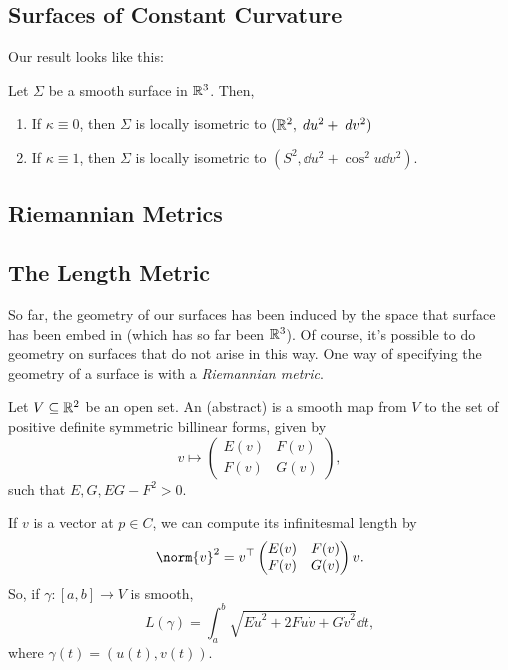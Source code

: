 \documentclass[a4paper, 10pt, twocolumn]{amsart}
\begin{document}
\subsection{Surfaces of Constant Curvature}

Our result looks like this:

\begin{proposition}
    Let $\Sigma$ be a smooth surface in $\mathbb{R}^3$. Then,
    \begin{enumerate}[label=(\roman*)]
        \item If $\kappa \equiv 0$, then $\Sigma$ is locally isometric to $(\mathbb{R}^2, \; d u^2 + \; d v^2)$
        \item If $\kappa \equiv 1$, then $\Sigma$ is locally isometric to $(S^2, \dd u^2 + \cos^2 u  \dd v^2)$.
    \end{enumerate}
\end{proposition}

\subsection{Riemannian Metrics}

\subsection{The Length Metric}

So far, the geometry of our surfaces has been induced by the space that surface has been embed in (which has so far been $\mathbb{R}^3$). Of course, it's possible to do geometry on surfaces that do not arise in this way. 
One way of specifying the geometry of a surface is with a \emph{Riemannian metric}.

\begin{definition}
    Let $V \subseteq \mathbb{R}^2$ be an open set. An (abstract)  is a smooth map from $V$ to the set of positive definite symmetric billinear forms, given by
    $$
    v \mapsto \begin{pmatrix}
        E(v) & F(v) \\
        F(v) & G(v)
    \end{pmatrix},
    $$
    such that $E, G, EG - F^2 > 0$.
\end{definition}

If $v$ is a vector at $p \in C$, we can compute its infinitesmal length by
$$
\norm{v}^2 = v^\top \begin{pmatrix}
    E(v) & F(v) \\ F(v) & G(v)
\end{pmatrix} v.
$$
So, if $\gamma: [a, b] \rightarrow V$ is smooth,
$$
L(\gamma) = \int_a^b \sqrt{E \dot{u}^2 + 2F \dot{u}\dot{v} + G \dot{v}^2} \dd t,
$$
where $\gamma(t) = (u(t), v(t))$.

\end{document}
